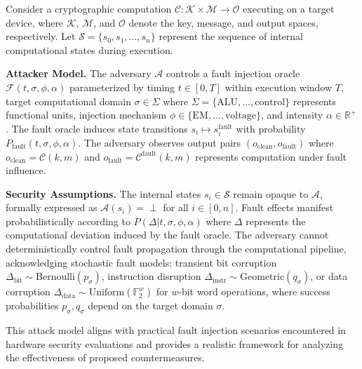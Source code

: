 \documentclass[journal=tches,final]{iacrtrans}
\begin{document}
Consider a cryptographic computation $\mathcal{C}: \mathcal{K} \times \mathcal{M} \rightarrow \mathcal{O}$ executing on a target device, where $\mathcal{K}$, $\mathcal{M}$, and $\mathcal{O}$ denote the key, message, and output spaces, respectively. Let $\mathcal{S} = \{s_0, s_1, \ldots, s_n\}$ represent the sequence of internal computational states during execution.

\textbf{Attacker Model.} The adversary $\mathcal{A}$ controls a fault injection oracle $\mathcal{F}(t, \sigma, \phi, \alpha)$ parameterized by timing $t \in [0, T]$ within execution window $T$, target computational domain $\sigma \in \Sigma$ where $\Sigma = \{\text{ALU}, \dots, \text{control}\}$ represents functional units, injection mechanism $\phi \in \{\text{EM}, \dots, \text{voltage}\}$, and intensity $\alpha \in \mathbb{R}^+$. 
The fault oracle induces state transitions $s_i \mapsto s_i^{\text{fault}}$ with probability $P_{\text{fault}}(t, \sigma, \phi, \alpha)$. The adversary observes output pairs $(o_{\text{clean}}, o_{\text{fault}})$ where $o_{\text{clean}} = \mathcal{C}(k, m)$ and $o_{\text{fault}} = \mathcal{C}^{\text{fault}}(k, m)$ represents computation under fault influence.

\textbf{Security Assumptions.} The internal states $s_i \in \mathcal{S}$ remain opaque to $\mathcal{A}$, formally expressed as $\mathcal{A}(s_i) = \perp$ for all $i \in [0, n]$. Fault effects manifest probabilistically according to $P(\Delta | t, \sigma, \phi, \alpha)$ where $\Delta$ represents the computational deviation induced by the fault oracle. The adversary cannot deterministically control fault propagation through the computational pipeline, acknowledging stochastic fault models: transient bit corruption $\Delta_{\text{bit}} \sim \text{Bernoulli}(p_{\sigma})$, instruction disruption $\Delta_{\text{instr}} \sim \text{Geometric}(q_{\sigma})$, or data corruption $\Delta_{\text{data}} \sim \text{Uniform}(\mathbb{F}_2^w)$ for $w$-bit word operations, where success probabilities $p_{\sigma}, q_{\sigma}$ depend on the target domain $\sigma$.

This attack model aligns with practical fault injection scenarios encountered in hardware security evaluations and provides a realistic framework for analyzing the effectiveness of proposed countermeasures.




\end{document}

